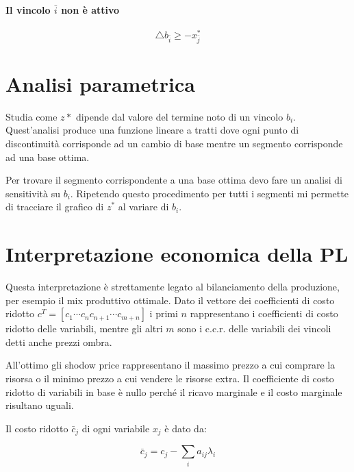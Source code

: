 \paragraph{Il vincolo $\bar{i}$ non è attivo}

\begin{equation}
	\triangle b_{\bar{i}} \geq -x_{\bar{j}}^*
\end{equation}

\section{Analisi parametrica}
Studia come $z*$ dipende dal valore del termine noto di un vincolo $b_i$.
Quest'analisi produce una funzione lineare a tratti dove ogni punto di discontinuità corrisponde ad un cambio di base mentre un segmento corrisponde ad una base ottima.

Per trovare il segmento corrispondente a una base ottima devo fare un analisi di sensitività su $b_i$. Ripetendo questo procedimento per tutti i segmenti mi permette di tracciare il grafico di $z^*$ al variare di $b_i$.

\section{Interpretazione economica della PL}
Questa interpretazione è strettamente legato al bilanciamento della produzione, per esempio il mix produttivo ottimale.
Dato il vettore dei coefficienti di costo ridotto $c^T = [ c_1 \dotsm c_n c_{n+1} \dotsm c_{m+n} ]$ i primi $n$ rappresentano i coefficienti di costo ridotto delle variabili, mentre gli altri $m$ sono i c.c.r. delle variabili dei vincoli detti anche prezzi ombra.

All'ottimo gli shodow price rappresentano il massimo prezzo a cui comprare la risorsa o il minimo prezzo a cui vendere le risorse extra. 
Il coefficiente di costo ridotto di variabili in base è nullo perché il ricavo marginale e il costo marginale risultano uguali.

Il costo ridotto $\bar{c}_j$ di ogni variabile $x_j$ è dato da:

\begin{equation} \label{costoRidotto}
	\bar{c}_j = c_j - \sum_i a_{ij} \lambda_i
\end{equation}
